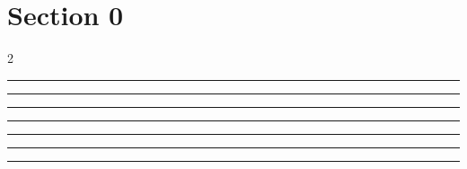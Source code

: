 \documentclass[11pt,a4paper]{article}
\begin{document}
\section{Section 0}
\begin{multicols}{2}
\begin{swarmwrap}
  \begin{minipage}[t]{2cm}
    \centering
    \textcolor{blue!30}{\rule{\linewidth}{2cm}}
  \end{minipage}%
\end{swarmwrap}
\swarmwrapnext\lipsum[1]\lipsum[2]
\end{multicols}
\begin{swarmwrap}
  \begin{minipage}[t]{3cm}
    \centering
    \textcolor{red!20}{\rule{\linewidth}{3cm}}
  \end{minipage}%
\end{swarmwrap}
\swarmwrapnext\lipsum[1]\lipsum[2]
\begin{swarmwrap}
  \begin{minipage}[t]{4cm}
    \centering
    \textcolor{red!20}{\rule{\linewidth}{4cm}}
  \end{minipage}%
\end{swarmwrap}
\swarmwrapnext\lipsum[1]\lipsum[2]\lipsum[3]
\begin{swarmwrap}
  \begin{minipage}[t]{5cm}
    \centering
    \textcolor{red!20}{\rule{\linewidth}{5cm}}
  \end{minipage}%
\end{swarmwrap}
\swarmwrapnext\lipsum[1]\lipsum[2]\lipsum[3]\lipsum[4]
\begin{swarmwrap}
  \begin{minipage}[t]{2cm}
    \centering
    \textcolor{red!20}{\rule{\linewidth}{6cm}}
  \end{minipage}%
\end{swarmwrap}
\swarmwrapnext\lipsum[1]\lipsum[2]\lipsum[3]\lipsum[4]\lipsum[5]
\begin{swarmwrap}
  \begin{minipage}[t]{3cm}
    \centering
    \textcolor{red!20}{\rule{\linewidth}{7cm}}
  \end{minipage}%
\end{swarmwrap}
\swarmwrapnext\lipsum[1]\lipsum[2]\lipsum[3]\lipsum[4]\lipsum[5]\lipsum[6]
\begin{swarmwrap}
  \begin{minipage}[t]{4cm}
    \centering
    \textcolor{red!20}{\rule{\linewidth}{8cm}}
  \end{minipage}%
\end{swarmwrap}
\swarmwrapnext\lipsum[1]
\end{document}

